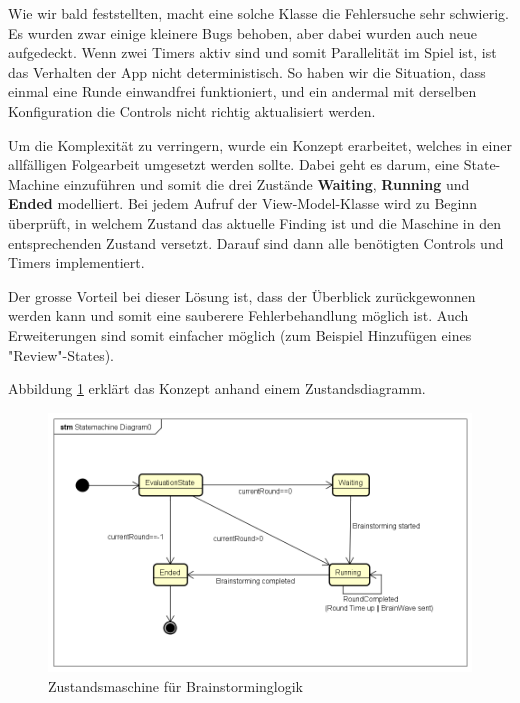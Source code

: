 Wie wir bald feststellten, macht eine solche Klasse die Fehlersuche sehr schwierig. Es wurden zwar einige kleinere Bugs behoben, aber dabei wurden auch neue aufgedeckt. Wenn zwei Timers aktiv sind und somit Parallelität im Spiel ist, ist das Verhalten der App nicht deterministisch. So haben wir die Situation, dass einmal eine Runde einwandfrei funktioniert, und ein andermal mit derselben Konfiguration die Controls nicht richtig aktualisiert werden. 

Um die Komplexität zu verringern, wurde ein Konzept erarbeitet, welches in einer allfälligen Folgearbeit umgesetzt werden sollte. Dabei geht es darum, eine State-Machine einzuführen und somit die drei Zustände \textbf{Waiting}, \textbf{Running} und \textbf{Ended} modelliert. Bei jedem Aufruf der View-Model-Klasse wird zu Beginn überprüft, in welchem Zustand das aktuelle Finding ist und die Maschine in den entsprechenden Zustand versetzt. Darauf sind dann alle benötigten Controls und Timers implementiert. 

Der grosse Vorteil bei dieser Lösung ist, dass der Überblick zurückgewonnen werden kann und somit eine sauberere Fehlerbehandlung möglich ist. Auch Erweiterungen sind somit einfacher möglich (zum Beispiel Hinzufügen eines "Review"-States). 

Abbildung \ref{fig:statemachine-brainstorming} erklärt das Konzept anhand einem Zustandsdiagramm.


\begin{figure}
	\centering
	\includegraphics[width=0.7\linewidth]{img/techn-bericht/statemachine-brainstorming}
	\caption{Zustandsmaschine für Brainstorminglogik}
	\label{fig:statemachine-brainstorming}
\end{figure}

	
	